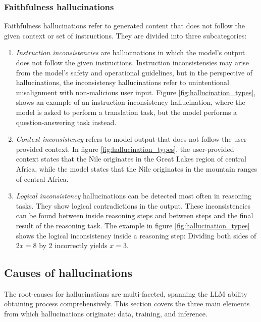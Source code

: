 \documentclass[english, 12pt, a4paper, sci, utf8, a-2b, online]{../definitions/aaltothesis}
\begin{document}
\subsubsection{Faithfulness hallucinations} \label{sec:faithfulness_hallucinations}

Faithfulness hallucinations refer to generated content that does not follow the given context or set of instructions. They are divided into three subcategories:

\begin{enumerate}
    \item \textit{Instruction inconsistencies} are hallucinations in which the model's output does not follow the given instructions. Instruction inconsistensies may arise from the model's safety and operational guidelines, but in the perspective of hallucinations, the inconsistensy hallucinations refer to unintentional misalignment with non-malicious user input. Figure \ref{fig:hallucination_types}, shows an example of an instruction inconsistency hallucination, where the model is asked to perform a translation task, but the model performs a question-answering task instead.
    \item \textit{Context inconsistency} refers to model output that does not follow the user-provided context. In figure \ref{fig:hallucination_types}, the user-provided context states that the Nile originates in the Great Lakes region of central Africa, while the model states that the Nile originates in the mountain ranges of central Africa.
    \item \textit{Logical inconsistency} hallucinations can be detected most often in reasoning tasks. They show logical contradictions in the output. These inconsistencies can be found between inside reasoning steps and between steps and the final result of the reasoning task. The example in figure \ref{fig:hallucination_types} shows the logical inconsistency inside a reasoning step: Dividing both sides of $2x = 8$ by 2 incorrectly yields $x = 3$.
\end{enumerate}

\subsection{Causes of hallucinations} \label{sec:hallucination_causes}

The root-causes for hallucinations are multi-faceted, spanning the LLM ability obtaining process comprehensively. This section covers the three main elements from which hallucinations originate: data, training, and inference. 
\end{document}
